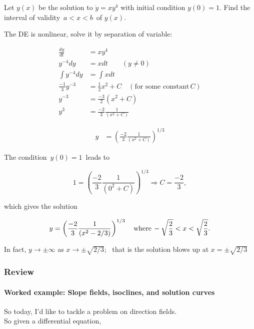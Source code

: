 Let $y(x)$ be the solution to $\dot y = x y^4$ with initial condition $y(0) = 1$.
Find the interval of validity $\, a<x<b\,$ of $y(x)$.

The DE is nonlinear, solve it by separation of variable:

\begin{align*}
  \frac{dy}{dt} &= x y^4 \\
  y^{-4} dy &= x dt \qquad (y \neq 0) \\
  \int y^{-4} dy &= \int x dt \\
  \frac{-1}{3} y^{-3}  &= \frac{1}{2} x^2 + C \quad (\text{for some constant}\, C) \\
  y^{-3} &= \frac{-3}{2} ( x^2 + C ) \\
  y^{3} & = \frac{-2}{3} \frac{1}{( x^2 + C )}
\end{align*}

\clearpage

\begin{align*}
  y &=  \left( \frac{-2}{3} \frac{1}{\left( x^2 + C \right)} \right)^{1/3}
\end{align*}

The condition $\, y(0) = 1\,$ leads to

\begin{equation*}
  1 = \left( \frac{-2}{3} \frac{1}{\left( 0^2 + C \right)} \right)^{1/3}
  \Longrightarrow C = \frac{-2}{3}, 
\end{equation*}

which gives the solution

\begin{equation*}
  y = \left( \frac{-2}{3} \frac{1}{( x^2 - 2/3)} \right)^{1/3}
  \quad \text{where\,} -\sqrt {\frac{2}{3}}<x<\sqrt {\frac{2}{3}}. 
\end{equation*}

In fact, $y\rightarrow \pm \infty$ as $x\rightarrow \pm \sqrt {2/3};\, \,$
that is the solution blows up at $x=\pm \sqrt {2/3}$

\clearpage

\subsubsection{Review}

\paragraph{Worked example: Slope fields, isoclines, and solution curves}
So today, I'd like to tackle a problem on direction fields.\\
So given a differential equation,

